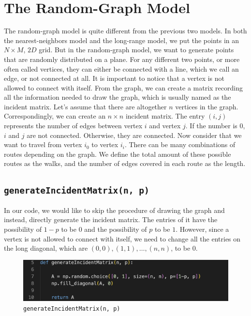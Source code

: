 \documentclass[11pt]{book}
\begin{document}
\section{The Random-Graph Model}

The random-graph model is quite different from the previous two models. In both the nearest-neighbors model and the long-range model, we put the points in an $N \times M$, $2D$ grid. But in the random-graph model, we want to generate points that are randomly distributed on a plane. For any different two points, or more often called vertices, they can either be connected with a line, which we call an edge, or not connected at all. It is important to notice that a vertex is not allowed to connect with itself. From the graph, we can create a matrix recording all the information needed to draw the graph, which is usually named as the incident matrix. Let's assume that there are altogether $n$ vertices in the graph. Correspondingly, we can create an $n \times n$ incident matrix. The entry $(i, j)$ represents the number of edges between vertex $i$ and vertex $j$. If the number is 0, $i$ and $j$ are not connected. Otherwise, they are connected. Now consider that we want to travel from vertex $i_0$ to vertex $i_i$. There can be many combinations of routes depending on the graph. We define the total amount of these possible routes as the walks, and the number of edges covered in each route as the length. 

\subsection{\texttt{generateIncidentMatrix(n, p)}}
In our code, we would like to skip the procedure of drawing the graph and instead, directly generate the incident matrix. The entries of it have the possibility of $1-p$ to be $0$ and the possibility of $p$ to be $1$. However, since a vertex is not allowed to connect with itself, we need to change all the entries on the long diagonal, which are $(0, 0), (1, 1), \ldots, (n, n)$, to be $0$.

\begin{figure}
    \centering
    \includegraphics[width=1\linewidth]{rg_generateIncidentMatrix.png}
    \caption{\texttt{generateIncidentMatrix(n, p)}}
    \label{fig48}
\end{figure}
\end{document}
